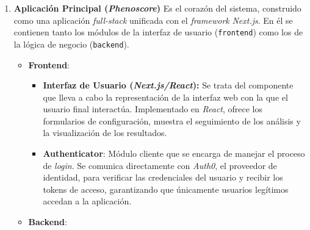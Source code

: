 \begin{enumerate}
    \item \textbf{Aplicación Principal (\textit{Phenoscore})}
    Es el corazón del sistema, construido como una aplicación \textit{full-stack} unificada con el \textit{framework} \textit{Next.js}. En él se contienen tanto los módulos de la interfaz de usuario (\texttt{frontend}) como los de la lógica de negocio (\texttt{backend}).
    \begin{itemize}
        \item \textbf{Frontend}:
        
            \begin{itemize}
                \item \textbf{Interfaz de Usuario (\textit{Next.js/React}):} Se trata del componente que lleva a cabo la representación de la interfaz web con la que el usuario final interactúa. Implementado en \textit{React}, ofrece los formularios de configuración, muestra el seguimiento de los análisis y la visualización de los resultados.
                \item \textbf{Authenticator}: Módulo cliente que se encarga de manejar el proceso de \textit{login}. Se comunica directamente con \textit{Auth0}, el proveedor de identidad, para verificar las credenciales del usuario y recibir los tokens de acceso, garantizando que únicamente usuarios legítimos accedan a la aplicación.
            \end{itemize}
            
        \item \textbf{Backend}:
        

\end{itemize}
\end{enumerate}

